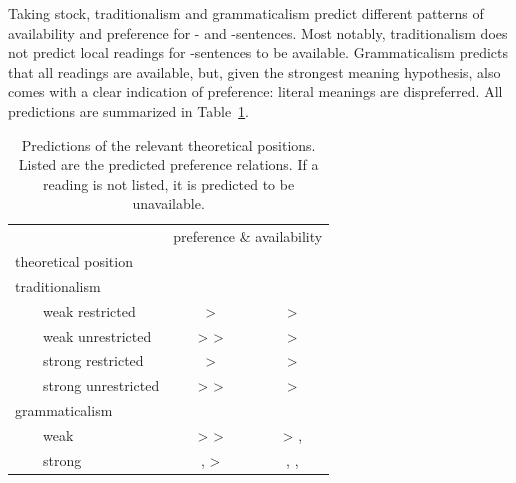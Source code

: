 \documentclass[fleqn,reqno,10pt,draft]{article}
\newcommand{\lit}{\acro{lit}}
\newcommand{\glb}{\acro{glb}}
\newcommand{\loc}{\acro{loc}}
\newcommand{\as}{\acro{as}}
\renewcommand{\es}{\acro{es}}
\begin{document}
\medskip

Taking stock, traditionalism and grammaticalism predict different
patterns of availability and preference for \as- and
\es-sentences. Most notably, traditionalism does not predict local
readings for \es-sentences to be available. Grammaticalism predicts
that all readings are available, but, given the strongest meaning
hypothesis, also comes with a clear indication of preference: literal
meanings are dispreferred. All predictions are summarized in
Table~\ref{tab:predictions}.


\begin{table}[t]
  \centering
  \begin{tabular}{lcc}
    & \multicolumn{2}{c}{preference \& availability}
    \\ \cmidrule(r){2-3}
    theoretical position
    & \as
    & \es
    \\ \midrule
    traditionalism
    \\
    \ \ \ \ weak restricted 
    & \lit > \glb 
    & \lit > \glb
    \\
    \ \ \ \ weak unrestricted
    & \lit > \glb > \loc 
    & \lit > \glb
    \\
    \ \ \ \ strong restricted
    & \glb > \lit 
    & \glb > \lit
    \\
    \ \ \ \ strong unrestricted
    & \glb > \loc > \lit 
    & \glb > \lit
    \\
    grammaticalism
    \\
    \ \ \ \ weak
    & \loc > \glb > \lit 
    & \glb > \lit, \loc
    \\
    \ \ \ \ strong
    & \glb, \loc > \lit 
    & \glb, \loc , \lit
    \\
  \end{tabular}
  \caption{Predictions of the relevant theoretical positions. Listed
    are the predicted preference relations. If a reading is not
    listed, it is predicted to be unavailable.}
  \label{tab:predictions}
\end{table}
\end{document}
